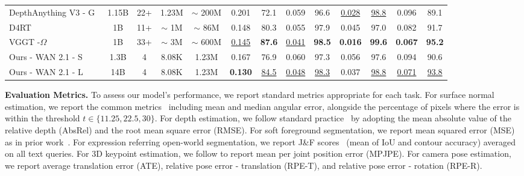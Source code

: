 \documentclass[11pt, a4paper, logo, onecolumn]{googledeepmind}
\begin{document}
\begin{table}[t!]
{\begin{tabular}{@{}l c ccc cc cc cc cc@{}}
    \midrule
    DepthAnything V3 - G~\cite{lin2025depth} & 1.15B & 22+ & 1.23M & $\sim$ 200M & 0.201 & 72.1 & {0.059} & 96.6 & \underline{0.028} & \underline{98.8} & 0.096 & 89.1 \\
    
    D4RT~\cite{zhang2025efficiently} & 1B & 11+ & $\sim$ 1M & $\sim$ 86M & 0.148 & 80.3 & 0.055 & 97.9 & 0.045 & 97.0 & 0.082 & 91.7 \\
    
    VGGT -$\Omega$~\cite{wang2026vggt} & 1B & 33+ & $\sim$ 3M & $\sim$ 600M & \underline{0.145} & \textbf{87.6} & \underline{0.041} & \textbf{98.5} & \textbf{0.016} & \textbf{99.6} & \textbf{0.067} & \textbf{95.2} \\
    
    

    Ours - WAN 2.1 - S & 1.3B & 4 & 8.08K & 1.23M & {0.167} & {76.9} & 0.060 & {97.3} & {0.056} & {97.6} & {0.094} & {90.6} \\
    
    


    
    
    Ours - WAN 2.1 - L & 14B & 4 & 8.08K & 1.23M & \textbf{0.130} & \underline{84.5} & \underline{0.048} & \underline{98.3} & 0.037 & \underline{98.8} & \underline{0.071} & \underline{93.8} \\

    
    
    
    \bottomrule
    \end{tabular}
}
\vspace{-1em}
\end{table}



















\noindent\textbf{{Evaluation Metrics.}} 
To assess our model's performance, we report standard metrics appropriate for each task. 
For surface normal estimation, we report the common metrics~\cite{saleh2025david,sapienseccv2024} including mean and median angular error, alongside the percentage of pixels where the error is within the threshold $t \in \{11.25, 22.5, 30\}$. 
For depth estimation, we follow standard practice~\cite{sapienseccv2024,ranftl2020towards,yang2024depth} by adopting the mean absolute value of the relative depth (AbsRel) and the root mean square error (RMSE).
For soft foreground segmentation, we report mean squared error (MSE) as in prior work~\cite{saleh2025david,yang2025matanyone,lin2022robust,lin2021real}.
For expression referring open-world segmentation, we report J\&F scores~\cite{perazzi2016benchmark} (mean of IoU and contour accuracy) averaged on all text queries.
For 3D keypoint estimation, we follow \cite{genmo2025,wang2024tram} to report mean per joint position error (MPJPE).
For camera pose estimation, we report average translation error (ATE), relative pose error - translation (RPE-T), and relative pose error - rotation (RPE-R).
\end{document}
